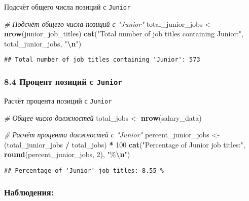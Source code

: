 \documentclass[
]{article}
\newenvironment{Shaded}{\begin{snugshade}}{\end{snugshade}}
\newcommand{\CommentTok}[1]{\textcolor[rgb]{0.56,0.35,0.01}{\textit{#1}}}
\newcommand{\DecValTok}[1]{\textcolor[rgb]{0.00,0.00,0.81}{#1}}
\newcommand{\FunctionTok}[1]{\textcolor[rgb]{0.13,0.29,0.53}{\textbf{#1}}}
\newcommand{\NormalTok}[1]{#1}
\newcommand{\OtherTok}[1]{\textcolor[rgb]{0.56,0.35,0.01}{#1}}
\newcommand{\SpecialCharTok}[1]{\textcolor[rgb]{0.81,0.36,0.00}{\textbf{#1}}}
\newcommand{\StringTok}[1]{\textcolor[rgb]{0.31,0.60,0.02}{#1}}
\begin{document}
Подсчёт общего числа позиций с \texttt{Junior}

\begin{Shaded}
\begin{Highlighting}[]
\CommentTok{\# Подсчёт общего числа позиций с "Junior"}
\NormalTok{total\_junior\_jobs }\OtherTok{\textless{}{-}} \FunctionTok{nrow}\NormalTok{(junior\_job\_titles)}
\FunctionTok{cat}\NormalTok{(}\StringTok{"Total number of job titles containing \textquotesingle{}Junior\textquotesingle{}:"}\NormalTok{, total\_junior\_jobs, }\StringTok{"}\SpecialCharTok{\textbackslash{}n}\StringTok{"}\NormalTok{)}
\end{Highlighting}
\end{Shaded}

\begin{verbatim}
## Total number of job titles containing 'Junior': 573
\end{verbatim}

\subsubsection{\texorpdfstring{8.4 Процент позиций с
\texttt{Junior}}{8.4 Процент позиций с Junior}}\label{ux43fux440ux43eux446ux435ux43dux442-ux43fux43eux437ux438ux446ux438ux439-ux441-junior}

Расчёт процента позиций с \texttt{Junior}

\begin{Shaded}
\begin{Highlighting}[]
\CommentTok{\# Общее число должностей}
\NormalTok{total\_jobs }\OtherTok{\textless{}{-}} \FunctionTok{nrow}\NormalTok{(salary\_data)}

\CommentTok{\# Расчёт процента должностей с "Junior"}
\NormalTok{percent\_junior\_jobs }\OtherTok{\textless{}{-}}\NormalTok{ (total\_junior\_jobs }\SpecialCharTok{/}\NormalTok{ total\_jobs) }\SpecialCharTok{*} \DecValTok{100}
\FunctionTok{cat}\NormalTok{(}\StringTok{"Percentage of \textquotesingle{}Junior\textquotesingle{} job titles:"}\NormalTok{, }\FunctionTok{round}\NormalTok{(percent\_junior\_jobs, }\DecValTok{2}\NormalTok{), }\StringTok{"\%}\SpecialCharTok{\textbackslash{}n}\StringTok{"}\NormalTok{)}
\end{Highlighting}
\end{Shaded}

\begin{verbatim}
## Percentage of 'Junior' job titles: 8.55 %
\end{verbatim}

\subsubsection{Наблюдения:}\label{ux43dux430ux431ux43bux44eux434ux435ux43dux438ux44f-5}
\end{document}
